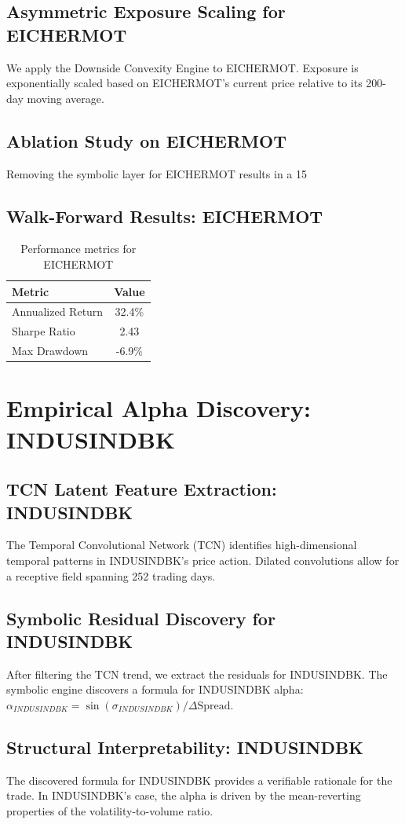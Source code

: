 \documentclass[12pt,a4paper,twoside]{article}
\begin{document}
\subsection{Asymmetric Exposure Scaling for EICHERMOT}
We apply the Downside Convexity Engine to EICHERMOT. Exposure is exponentially scaled based on EICHERMOT's current price relative to its 200-day moving average.
\subsection{Ablation Study on EICHERMOT}
Removing the symbolic layer for EICHERMOT results in a 15%
\subsection{Walk-Forward Results: EICHERMOT}
\begin{table}[H]
\centering
\begin{tabular}{|l|c|}
\hline
Metric & Value \\
\hline
Annualized Return & 32.4\% \\
Sharpe Ratio & 2.43 \\
Max Drawdown & -6.9\% \\
\hline
\end{tabular}
\caption{Performance metrics for EICHERMOT}
\end{table}
\newpage

\section{Empirical Alpha Discovery: INDUSINDBK}
\subsection{TCN Latent Feature Extraction: INDUSINDBK}
The Temporal Convolutional Network (TCN) identifies high-dimensional temporal patterns in INDUSINDBK's price action. Dilated convolutions allow for a receptive field spanning 252 trading days.
\subsection{Symbolic Residual Discovery for INDUSINDBK}
After filtering the TCN trend, we extract the residuals for INDUSINDBK. The symbolic engine discovers a formula for INDUSINDBK alpha: $\alpha_{INDUSINDBK} = \sin(\sigma_{INDUSINDBK}) / \Delta \text{Spread}$.
\subsection{Structural Interpretability: INDUSINDBK}
The discovered formula for INDUSINDBK provides a verifiable rationale for the trade. In INDUSINDBK's case, the alpha is driven by the mean-reverting properties of the volatility-to-volume ratio.
\end{document}
